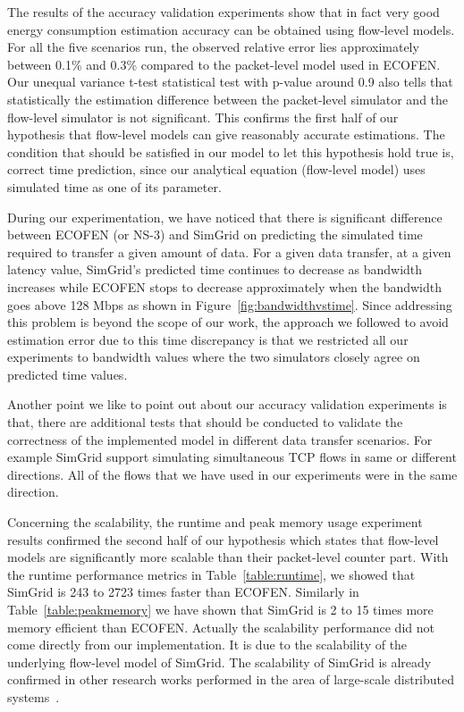 The results of the accuracy validation experiments show that in fact very good energy consumption estimation accuracy can be obtained using flow-level models. For all the five scenarios run, the observed relative error lies approximately between  0.1\% and 0.3\% compared to the packet-level model used in ECOFEN. Our unequal variance t-test statistical test with p-value around 0.9 also tells that statistically the estimation difference between the packet-level simulator and the flow-level simulator is not significant. This confirms the first half of our hypothesis that flow-level models can give reasonably accurate estimations. The condition that should be satisfied in our model to let this hypothesis hold true is, correct time prediction, since our analytical equation (flow-level model) uses simulated time as one of its parameter. 

During our experimentation, we have noticed that there is significant difference between ECOFEN (or NS-3) and SimGrid on predicting the simulated time required to transfer a given amount of data. For a given data transfer, at a given latency value, SimGrid's predicted time continues to decrease as bandwidth increases while ECOFEN stops to decrease approximately when the bandwidth goes above 128 Mbps as shown in Figure~\ref{fig:bandwidthvstime}. Since addressing this problem is beyond the scope of our work, the approach we followed to avoid estimation error due to this time discrepancy is that we restricted all our experiments to bandwidth values where the two simulators closely agree on predicted time values.

Another point we like to point out about our accuracy validation experiments is that, there are additional tests that should be conducted to validate the correctness of the implemented model in different data transfer scenarios. For example SimGrid support simulating simultaneous TCP flows in same or different directions. All of the flows that we have used in our experiments were in the same direction. 

Concerning the scalability, the runtime and peak memory usage experiment results confirmed the second half of our hypothesis which states that flow-level models are significantly more scalable than their packet-level counter part. With the runtime performance metrics in Table~\ref{table:runtime}, we showed that SimGrid is 243 to 2723 times faster than ECOFEN. Similarly in Table~\ref{table:peakmemory} we have shown that SimGrid is 2 to 15 times more memory efficient than ECOFEN. Actually the scalability performance did not come directly from our implementation. It is due to the scalability of the underlying flow-level model of SimGrid. The scalability of SimGrid is already confirmed in other research works performed in the area of large-scale distributed systems~\cite{DBLP:conf/ccgrid/QuinsonRT12,DBLP:journals/jpdc/CasanovaGLQS14}.

